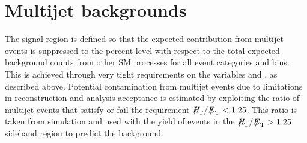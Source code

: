 \section{Multijet backgrounds}
\label{sec:qcd_background}

The signal region is defined so that the expected contribution from
multijet events is suppressed to the percent level with respect to
the total expected background counts from other SM processes for all
event categories and \scalht bins. This is achieved through very tight
requirements on the variables \alphat and \dphi, as described
above. 
%
Potential contamination from multijet events due to 
limitations in reconstruction and analysis acceptance is estimated 
by exploiting the ratio of multijet events 
that satisfy or fail the requirement $\mhtmet < 1.25$. This ratio is taken from simulation and used with the yield of events in the $\mhtmet > 1.25$ sideband region to predict the background.

%

